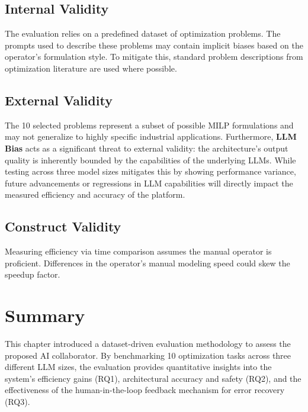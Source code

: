 \subsection{Internal Validity}
The evaluation relies on a predefined dataset of optimization problems. The prompts used to describe these problems may contain implicit biases based on the operator's formulation style. To mitigate this, standard problem descriptions from optimization literature are used where possible.

\subsection{External Validity}
The 10 selected problems represent a subset of possible MILP formulations and may not generalize to highly specific industrial applications. Furthermore, \textbf{LLM Bias} acts as a significant threat to external validity: the architecture's output quality is inherently bounded by the capabilities of the underlying LLMs. While testing across three model sizes mitigates this by showing performance variance, future advancements or regressions in LLM capabilities will directly impact the measured efficiency and accuracy of the platform.

\subsection{Construct Validity}
Measuring efficiency via time comparison assumes the manual operator is proficient. Differences in the operator's manual modeling speed could skew the speedup factor.

\section{Summary}
This chapter introduced a dataset-driven evaluation methodology to assess the proposed AI collaborator. By benchmarking 10 optimization tasks across three different LLM sizes, the evaluation provides quantitative insights into the system's efficiency gains (RQ1), architectural accuracy and safety (RQ2), and the effectiveness of the human-in-the-loop feedback mechanism for error recovery (RQ3).